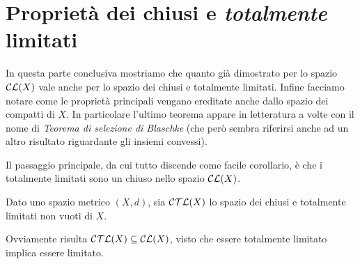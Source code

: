 \section{Proprietà dei chiusi e \emph{totalmente} limitati}
In questa parte conclusiva mostriamo che quanto già dimostrato per lo spazio $\mathcal{CL}(X)$ vale anche per lo spazio dei chiusi e totalmente limitati. Infine facciamo notare come le proprietà principali vengano ereditate anche dallo spazio dei compatti di $X$. In particolare l'ultimo teorema appare in letteratura a volte con il nome di \emph{Teorema di selezione di Blaschke} (che però sembra riferirsi anche ad un altro risultato riguardante gli insiemi convessi).

Il passaggio principale, da cui tutto discende come facile corollario, è che i totalmente limitati sono un chiuso nello spazio $\mathcal{CL}(X)$.

\begin{definition}
	Dato uno spazio metrico $(X,d)$, sia $\mathcal{CTL}(X)$ lo spazio dei chiusi e totalmente limitati non vuoti di $X$.
\end{definition}
\begin{remark}\label{SottinsiemeCTL}
	Ovviamente risulta $\mathcal{CTL}(X)\subseteq \mathcal{CL}(X)$, visto che essere totalmente limitato implica essere limitato.
\end{remark}

